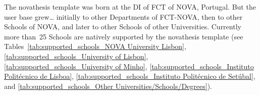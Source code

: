 The \gls{novathesis} template was born at the \gls{DI} of  \gls{FCT} of \gls{NOVA}, Portugal.  But the user base grew… initially to other Departments of FCT-NOVA, then to other Schools of NOVA, and later to other Schools of other Universities.  Currently more than~25 Schools are natively supported by the \gls{novathesis} template (see Tables~\ref{tab:supported_schools_NOVA University Lisbon}, \ref{tab:supported_schools_University of Lisbon}, \ref{tab:supported_schools_University of Minho}, \ref{tab:supported_schools_Instituto Politécnico de Lisboa}, \ref{tab:supported_schools_Instituto Politécnico de Setúbal}, and \ref{tab:supported_schools_Other Universities/Schools/Degrees}).

\newenvironment{ntUniversity}[1]{
  \renewcommand\tabularxcolumn[1]{m{##1}}%
  \rowcolors{1}{}{GhostWhite}
    \xltabular{\linewidth}{cX}%
      \caption{#1's Schools supported by the \novathesis\ template\label{tab:supported_schools_#1}}\\
    \toprule%
    \rowcolor{Gainsboro}%
    & \Gape[1.5ex]{\thead[l]{#1}}\\
    \midrule%
}{%
    \bottomrule
    \endxltabular%
}

\makeatletter
\newtoggle{coverspace}
\newcommand{\docCover}[1]{%
  \setlength{\fboxsep}{0pt}%
  \togglefalse{coverspace}%
    \Gape[1.5ex]{\begin{mcellbox}[cc]
    \@for\i:=#1\do{%
      \fbox{\colorbox{White}{\texttt{[image: 1up/\\i]}}}%
        \ifx\@xfor@nextelement\@nnil
        \else
          \iftoggle{coverspace}{\togglefalse{coverspace}\\\\[-14pt]}{\toggletrue{coverspace}~}%
        \fi
  }%
    \end{mcellbox}}
}
\makeatother
\newcommand{\schlName}[3]{\textbf{#1} (\href{#3}{#2})}
\newcommand{\degreeName}[3]{\newline\null\quad • #1 \href{#3}{(#2)}}


